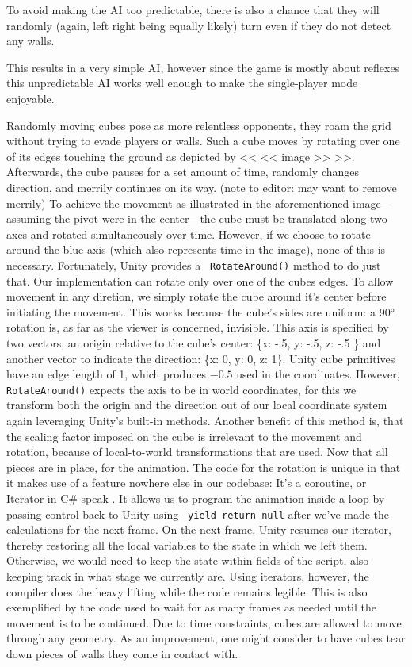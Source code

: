 \documentclass{report}
\newcommand{\cs}[1]{\texttt{\penalty 100 #1}}
\begin{document}
To avoid making the AI too predictable, there is also a chance that they will randomly (again, left right being equally likely) turn even if they do not detect any walls.

This results in a very simple AI, however since the game is mostly about reflexes this unpredictable AI works well enough to make the single-player mode enjoyable.

Randomly moving cubes pose as more relentless opponents, they roam the grid without trying to evade players or walls. Such a cube moves by rotating over one of its edges touching the ground as depicted by << << image >> >>.
 Afterwards, the cube pauses for a set amount of time, randomly changes direction, and merrily continues on its way.
  (note to editor: may want to remove merrily) To achieve the movement as illustrated in the aforementioned image---assuming the pivot were in the center---the cube must be translated along two axes and rotated simultaneously over time. 
  However, if we choose to rotate around the blue axis (which also represents time in the image), none of this is necessary. Fortunately, Unity provides a \cs{RotateAround()} method to do just that.
Our implementation can rotate only over one of the cubes edges. To allow movement in any diretion, we simply rotate the cube around it's center before initiating the movement. This works because the cube's sides are uniform: a 90° rotation is, as far as the viewer is concerned, invisible. This axis is specified by two vectors, an origin relative to the cube's center: \{x: -.5, y: -.5, z: -.5 \} and another vector to indicate the direction: \{x: 0, y: 0, z: 1\}. Unity cube primitives have an edge length of 1, which produces $-0.5$ used in the coordinates. However, \cs{RotateAround()} expects the axis to be in world coordinates, for this we transform both the origin and the direction out of our local coordinate system again leveraging Unity's built-in methods. Another benefit of this method is, that the scaling factor imposed on the cube is irrelevant to the movement and rotation, because of local-to-world transformations that are used.
Now that all pieces are in place, for the animation.
The code for the rotation is unique in that it makes use of a feature nowhere else in our codebase: It's a coroutine, or Iterator in C\#-speak \cite{csharpthing}.
 It allows us to program the animation inside a loop by passing control back to Unity using \cs{yield return null} after we've made the calculations for the next frame. On the next frame, Unity resumes our iterator, thereby restoring all the local variables to the state in which we left them. Otherwise, we would need to keep the state within fields of the script, also keeping track in what stage we currently are. Using iterators, however, the compiler does the heavy lifting while the code remains legible. This is also exemplified by the code used to wait for as many frames as needed until the movement is to be continued.
Due to time constraints, cubes are allowed to move through any geometry. As an improvement, one might consider to have cubes tear down pieces of walls they come in contact with.
\end{document}
